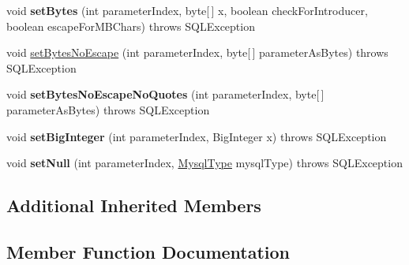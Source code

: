 \begin{DoxyCompactItemize}
void {\bfseries set\+Bytes} (int parameter\+Index, byte\mbox{[}$\,$\mbox{]} x, boolean check\+For\+Introducer, boolean escape\+For\+M\+B\+Chars)  throws S\+Q\+L\+Exception
\item 
void \mbox{\hyperlink{interfacecom_1_1mysql_1_1cj_1_1jdbc_1_1_jdbc_prepared_statement_a46f072b1d5f3463b8371262dc5ed9ead}{set\+Bytes\+No\+Escape}} (int parameter\+Index, byte\mbox{[}$\,$\mbox{]} parameter\+As\+Bytes)  throws S\+Q\+L\+Exception
\item 
\mbox{\label{interfacecom_1_1mysql_1_1cj_1_1jdbc_1_1_jdbc_prepared_statement_aac822ef5e0e6cb44d83c2b0afb4078fe}} 
void {\bfseries set\+Bytes\+No\+Escape\+No\+Quotes} (int parameter\+Index, byte\mbox{[}$\,$\mbox{]} parameter\+As\+Bytes)  throws S\+Q\+L\+Exception
\item 
\mbox{\label{interfacecom_1_1mysql_1_1cj_1_1jdbc_1_1_jdbc_prepared_statement_a6af501f3841da06821f86578cc154116}} 
void {\bfseries set\+Big\+Integer} (int parameter\+Index, Big\+Integer x)  throws S\+Q\+L\+Exception
\item 
\mbox{\label{interfacecom_1_1mysql_1_1cj_1_1jdbc_1_1_jdbc_prepared_statement_a3a6d8662a3372f19ead94698c2cf3ed1}} 
void {\bfseries set\+Null} (int parameter\+Index, \mbox{\hyperlink{enumcom_1_1mysql_1_1cj_1_1_mysql_type}{Mysql\+Type}} mysql\+Type)  throws S\+Q\+L\+Exception
\end{DoxyCompactItemize}
\subsection*{Additional Inherited Members}


\subsection{Member Function Documentation}
\mbox{\label{interfacecom_1_1mysql_1_1cj_1_1jdbc_1_1_jdbc_prepared_statement_a46f072b1d5f3463b8371262dc5ed9ead}} 

